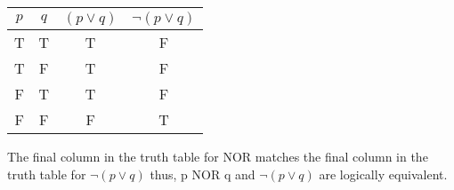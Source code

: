 \documentclass{article}
\begin{document}
\begin{flushleft}
\begin{table}[ht]

\begin{tabular}{|c|c||c|c|}

$ p $ & $ q $ & $ (p \vee q) $ & $  \neg (p \vee q) $ \\
\hline
T & T & T & F \\
\hline
T & F & T & F \\
\hline
F & T & T & F \\
\hline
F & F & F & T \\

\end{tabular}
\label{table:tt1}
\end{table}

The final column in the truth table for NOR matches the final column in the truth table for $\neg (p \lor q)$ thus, p NOR q and $\neg (p \lor q)$ are logically equivalent.

\end{flushleft}
\end{document}
